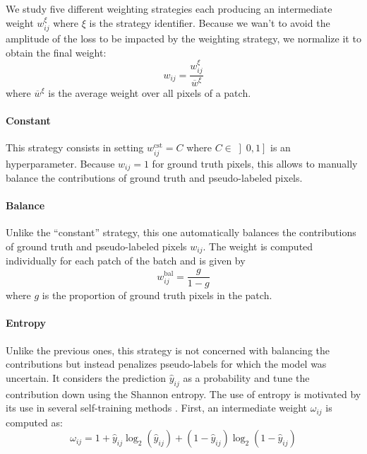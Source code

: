 We study five different weighting strategies each producing an intermediate weight $w^{\xi}_{ij}$ where $\xi$ is the strategy identifier. Because we wan't to avoid the amplitude of the loss to be impacted by the weighting strategy, we normalize it to obtain the final weight:
\begin{equation}
w_{ij} = \dfrac{w^{\xi}_{ij}}{\overline{w}^{\xi}}
\end{equation}
where $\overline{w}^{\xi}$ is the average weight over all pixels of a patch.

\paragraph{Constant} This strategy consists in setting $w^{\text{cst}}_{ij} = C$ where $C \in \left]0, 1\right]$ is an hyperparameter. Because $w_{ij} = 1$ for ground truth pixels, this allows to manually balance the contributions of ground truth and pseudo-labeled pixels. 

\paragraph{Balance} Unlike the ``constant'' strategy, this one automatically balances the contributions of ground truth and pseudo-labeled pixels $w_{ij}$. The weight is computed individually for each patch of the batch and is given by
\begin{equation}
w^{\text{bal}}_{ij} = \frac{g}{1 - g}
\label{eqn:balancegt}
\end{equation}
where $g$ is the proportion of ground truth pixels in the patch. 

\paragraph{Entropy} \label{par:entropyweight} Unlike the previous ones, this strategy is not concerned with balancing the contributions but instead penalizes pseudo-labels for which the model was uncertain. It considers the prediction $\hat{y}_{ij}$ as a probability and tune the contribution down using the Shannon entropy. The use of entropy is motivated by its use in several self-training methods \cite{grandvalet2004semi, lee2013pseudo}. First, an intermediate weight $\omega_{ij}$ is computed as: 
\begin{equation}
\omega_{ij} = 1 + \hat{y}_{ij} \log_2(\hat{y}_{ij}) + (1 - \hat{y}_{ij}) \log_2(1 - \hat{y}_{ij})
\label{eqn:entropyweight}
\end{equation}


